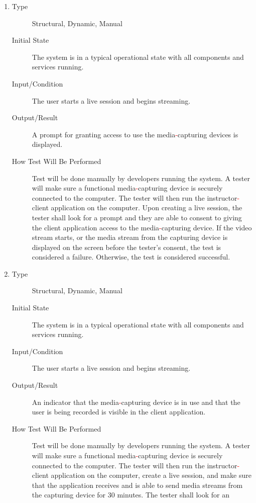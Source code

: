 \documentclass[12pt, titlepage]{article}
\newcommand{\rt}[1]{\textcolor{red}{#1}}
\begin{document}
\begin{enumerate}[NFR-T1]
\begin{description}
  \end{description}
\item \label{NFRT24}
  \begin{description}
  \item[Type] Structural, Dynamic, Manual
  \item[Initial State] The system is in a typical operational state with all
    components and services running.
  \item[Input/Condition] The user starts a live session and begins streaming.
  \item[Output/Result] A prompt for granting access to use the media\rt{-}capturing
    devices is displayed.
  \item[How Test Will Be Performed] Test will be done manually by developers
    running the system. A tester will make sure a functional media\rt{-}capturing
    device is securely connected to the computer. The tester will then run the
    instructor\rt{-}client application on the computer. Upon creating a live session,
    the tester shall look for a prompt and they are able to consent to giving
    the client application access to the media\rt{-}capturing device. If the video
    stream starts, or the media stream from the capturing device is displayed on
    the screen before the tester’s consent, the test is considered a failure.
    Otherwise, the test is considered successful.
  \end{description}
\item \label{NFRT25}
  \begin{description}
  \item[Type] Structural, Dynamic, Manual
  \item[Initial State] The system is in a typical operational state with all
    components and services running.
  \item[Input/Condition] The user starts a live session and begins streaming.
  \item[Output/Result] An indicator that the media\rt{-}capturing device is in use
    and that the user is being recorded is visible in the client application.
  \item[How Test Will Be Performed] Test will be done manually by developers
    running the system. A tester will make sure a functional media\rt{-}capturing
    device is securely connected to the computer. The tester will then run the
    instructor\rt{-}client application on the computer, create a live session, and
    make sure that the application receives and is able to send media streams
    from the capturing device for 30 minutes. The tester shall look for an

\end{description}
\end{enumerate}
\end{document}
